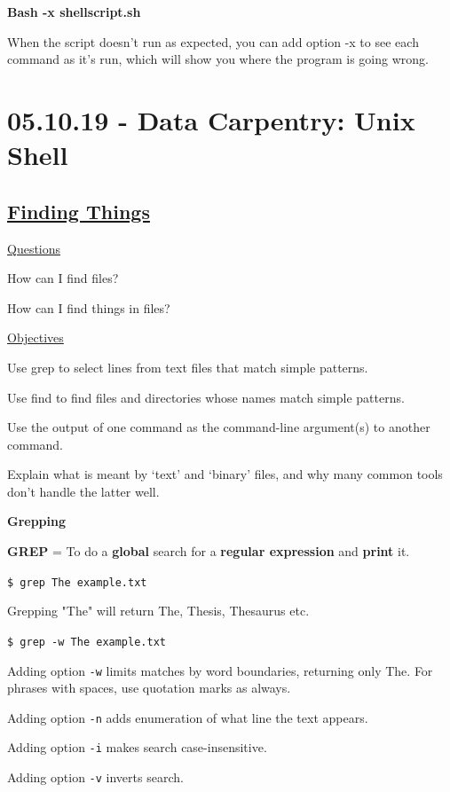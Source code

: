 \documentclass[12pt]{article}
\begin{document}
\vspace{1em}
\textbf{Bash -x shellscript.sh}

When the script doesn't run as expected, you can add option -x to see each command as it's run, which will show you where the program is going wrong.



\newpage\section{05.10.19 - Data Carpentry: Unix Shell}
\subsection{\href{http://swcarpentry.github.io/shell-novice/07-find/index.html}{\textbf{Finding Things}}}
\color{gray}
\underline{Questions}

How can I find files?

How can I find things in files?

\underline{Objectives}

Use grep to select lines from text files that match simple patterns.

Use find to find files and directories whose names match simple patterns.

Use the output of one command as the command-line argument(s) to another command.

Explain what is meant by ‘text’ and ‘binary’ files, and why many common tools don’t handle the latter well.
\color{black}

\vspace{1em}\textbf{Grepping}

\textbf{GREP} = To do a \textbf{global} search for a \textbf{regular expression} and \textbf{print} it.

\texttt{\$ grep The example.txt}

Grepping "The" will return The, Thesis, Thesaurus etc. 

\texttt{\$ grep -w The example.txt}

Adding option \texttt{-w} limits matches by word boundaries, returning only The. For phrases with spaces, use quotation marks as always.

Adding option \texttt{-n} adds enumeration of what line the text appears.

Adding option \texttt{-i} makes search case-insensitive.

Adding option \texttt{-v} inverts search.
\end{document}
